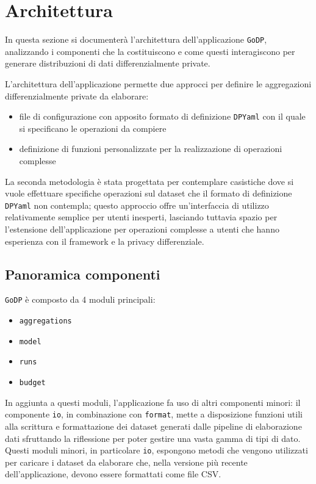 \section{Architettura}
In questa sezione si documenterà l'architettura dell'applicazione \texttt{GoDP}, analizzando i componenti che la costituiscono e come questi interagiscono per generare distribuzioni di dati differenzialmente private.

L'architettura dell'applicazione permette due approcci per definire le aggregazioni differenzialmente private da elaborare:
\begin{itemize}
    \item file di configurazione con apposito formato di definizione \texttt{DPYaml} con il quale si specificano le operazioni da compiere
    \item definizione di funzioni personalizzate per la realizzazione di operazioni complesse
\end{itemize}

La seconda metodologia è stata progettata per contemplare casistiche dove si vuole effettuare specifiche operazioni sul dataset che il formato di definizione \texttt{DPYaml} non contempla; questo approccio offre un'interfaccia di utilizzo relativamente semplice per utenti inesperti, lasciando tuttavia spazio per l'estensione dell'applicazione per operazioni complesse a utenti che hanno esperienza con il framework e la privacy differenziale.

\subsection{Panoramica componenti}
\texttt{GoDP} è composto da 4 moduli principali:
\begin{itemize}
    \item \texttt{aggregations}
    \item \texttt{model}
    \item \texttt{runs}
    \item \texttt{budget}
\end{itemize}

In aggiunta a questi moduli, l'applicazione fa uso di altri componenti minori: il componente \texttt{io}, in combinazione con \texttt{format}, mette a disposizione funzioni utili alla scrittura e formattazione dei dataset generati dalle pipeline di elaborazione dati sfruttando la riflessione per poter gestire una vasta gamma di tipi di dato. Questi moduli minori, in particolare \texttt{io}, espongono metodi che vengono utilizzati per caricare i dataset da elaborare che, nella versione più recente dell'applicazione, devono essere formattati come file CSV.

